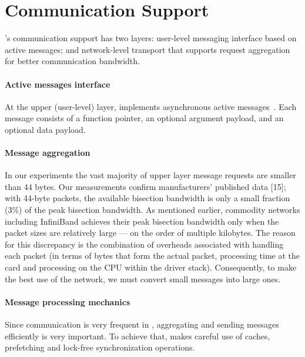 \section{Communication Support}
\label{sec:communication}

\Grappa's communication support has two layers: user-level messaging interface
based on active messages; and network-level transport that supports request
aggregation for better communication bandwidth.


\paragraph{Active messages interface} At the upper (user-level) layer, \Grappa
implements asynchronous active messages~\cite{vonEicken92}. Each message
consists of a function pointer, an optional argument payload, and an optional
data payload. 


\paragraph{Message aggregation} In our experiments the vast majority of upper
layer message requests are smaller than 44 bytes. Our measurements confirm
manufacturers' published data [15]; with 44-byte packets, the available
bisection bandwidth is only a small fraction (3\%) of the peak bisection
bandwidth. As mentioned earlier, commodity networks including InfiniBand
achieves their peak bisection bandwidth only when the packet sizes are
relatively large --- on the order of multiple kilobytes. The reason for this
discrepancy is the combination of overheads associated with handling each
packet (in terms of bytes that form the actual packet, processing time at the
card and processing on the CPU within the driver stack). Consequently, to make
the best use of the network, we must convert small messages into large ones.

\paragraph{Message processing mechanics} Since communication is very frequent
in \Grappa, aggregating and sending messages efficiently is very important. To
achieve that, \Grappa makes careful use of caches, prefetching and lock-free
synchronization operations. 

